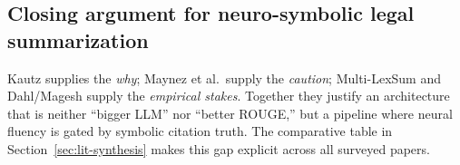 \subsection{Closing argument for neuro-symbolic legal summarization}

Kautz supplies the \emph{why}; Maynez et al.\ supply the \emph{caution}; Multi-LexSum and Dahl/Magesh supply the \emph{empirical stakes}. Together they justify an architecture that is neither ``bigger LLM'' nor ``better ROUGE,'' but a pipeline where neural fluency is gated by symbolic citation truth. The comparative table in Section~\ref{sec:lit-synthesis} makes this gap explicit across all surveyed papers.
